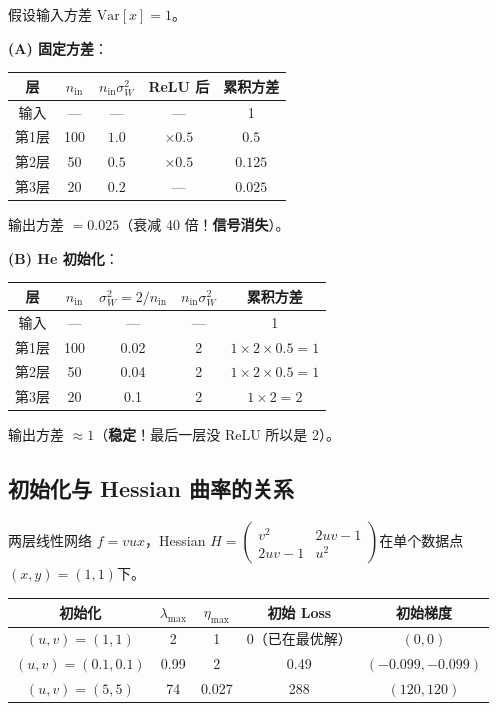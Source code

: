 \documentclass[12pt, a4paper]{ctexart}
\begin{document}
假设输入方差 $\text{Var}[x] = 1$。

\textbf{(A) 固定方差}：

\begin{center}
\begin{tabular}{c|cccc}
层 & $n_{\text{in}}$ & $n_{\text{in}}\sigma_W^2$ & ReLU 后 & 累积方差 \\
\hline
输入 & — & — & — & 1 \\
第1层 & 100 & $1.0$ & $\times 0.5$ & $0.5$ \\
第2层 & 50 & $0.5$ & $\times 0.5$ & $0.125$ \\
第3层 & 20 & $0.2$ & — & $0.025$ \\
\end{tabular}
\end{center}

输出方差 $= 0.025$（衰减 40 倍！\textbf{信号消失}）。

\textbf{(B) He 初始化}：

\begin{center}
\begin{tabular}{c|cccc}
层 & $n_{\text{in}}$ & $\sigma_W^2 = 2/n_{\text{in}}$ & $n_{\text{in}}\sigma_W^2$ & 累积方差 \\
\hline
输入 & — & — & — & 1 \\
第1层 & 100 & 0.02 & 2 & $1\times 2\times 0.5 = 1$ \\
第2层 & 50 & 0.04 & 2 & $1\times 2\times 0.5 = 1$ \\
第3层 & 20 & 0.1 & 2 & $1\times 2 = 2$ \\
\end{tabular}
\end{center}

输出方差 $\approx 1$（\textbf{稳定}！最后一层没 ReLU 所以是 2）。

\subsection{初始化与 Hessian 曲率的关系}

两层线性网络 $f = vux$，Hessian $H = \begin{pmatrix} v^2 & 2uv-1 \\ 2uv-1 & u^2 \end{pmatrix}$在单个数据点$(x,y) = (1,1)$下。

\begin{center}
\begin{tabular}{c|cccc}
初始化 & $\lambda_{\max}$ & $\eta_{\max}$ & 初始 Loss & 初始梯度 \\
\hline
$(u,v)=(1,1)$ & 2 & 1 & 0（已在最优解）& $(0,0)$ \\
$(u,v)=(0.1,0.1)$ & 0.99 & 2 & 0.49 & $(-0.099,-0.099)$ \\
$(u,v)=(5,5)$ & 74 & 0.027 & 288 & $(120,120)$ \\
\end{tabular}
\end{center}
\end{document}
